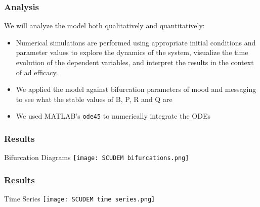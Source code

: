 \documentclass[12pt]{beamer}
\begin{document}
\begin{frame}
\frametitle{Analysis}
We will analyze the model both qualitatively and quantitatively:
\begin{itemize}
    \item Numerical simulations are performed using appropriate initial conditions and parameter values to explore the dynamics of the system, visualize the time evolution of the dependent variables, and interpret the results in the context of ad efficacy.
    \item We applied the model against bifurcation parameters of mood and messaging to see what the stable values of B, P, R and Q are
    \item We used MATLAB's \texttt{ode45} to numerically integrate the ODEs
\end{itemize}
\end{frame}

\begin{frame}
\frametitle{Results}
\begin{block}{Bifurcation Diagrams}
    \texttt{[image: SCUDEM bifurcations.png]}
\end{block}
\end{frame}

\begin{frame}
\frametitle{Results}
\begin{block}{Time Series}
    \texttt{[image: SCUDEM time series.png]}
\end{block}
\end{frame}
\end{document}
